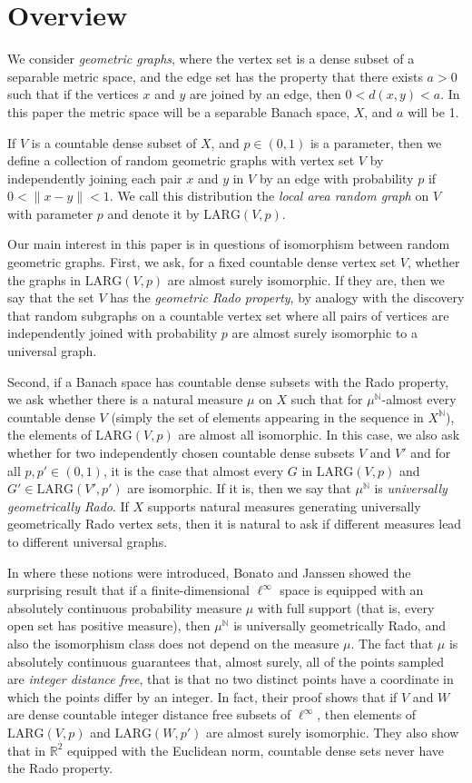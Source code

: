 \documentclass{daj}
\newcommand{\LARG}{\mathrm{LARG}}
\newcommand{\N}{\mathbb N}
\newcommand{\R}{\mathbb R}
\begin{document}
\section{Overview}
We consider \emph{geometric graphs}, where the vertex set is a dense subset of a
separable metric space, and the edge set has the property that there exists $a>0$ such that
if the vertices $x$ and $y$ are joined by an edge, then $0<d(x,y)<a$.
In this paper the metric space will be a separable Banach space, $X$,
and $a$ will be 1.

If $V$ is a countable dense subset of $X$, and $p\in(0,1)$ is a parameter,
then we define a collection of random geometric graphs with vertex set $V$ by independently joining
each pair $x$ and $y$ in $V$ by an edge with probability $p$ if $0<\|x-y\|<1$.
We call this distribution the \emph{local area random graph} on $V$ with parameter $p$
and denote it by $\LARG(V,p)$.

Our main interest in this paper is in questions of isomorphism between random geometric graphs. First, we ask, for a fixed countable dense vertex set $V$, whether the graphs in $\LARG(V,p)$ are almost surely isomorphic. If they are, then we say that the set $V$ has the \emph{geometric Rado property}, by analogy with the discovery that random subgraphs on
a countable vertex set where all pairs of vertices are independently joined with probability $p$
are almost surely isomorphic to a universal graph.

Second, if a Banach space has countable dense subsets with the Rado property, we ask whether
there is a natural measure $\mu$ on $X$ such that for $\mu^\N$-almost every
countable dense $V$ (simply the set of elements appearing in the sequence in $X^\N$),
the elements of $\LARG(V,p)$ are almost all isomorphic. In this case, we also
ask whether for two independently chosen countable dense subsets $V$ and $V'$ and for all $p,p'\in(0,1)$, it is the case that almost every $G$ in $\LARG(V,p)$ and $G'\in\LARG(V',p')$ are isomorphic.
If it is, then we say that $\mu^\N$ is \emph{universally geometrically Rado}.
If $X$ supports natural measures generating universally geometrically Rado vertex sets, then it is
natural to ask if different measures lead to different universal graphs.

In \cite{BJ1} where these notions were introduced, Bonato and Janssen showed the surprising result that
if a finite-dimensional $\ell^\infty$ space is equipped with an absolutely continuous probability
measure $\mu$ with full support (that is, every open set has positive measure), then $\mu^\N$ is
universally geometrically Rado, and also the isomorphism class does not depend on the measure $\mu$.
The fact that $\mu$ is absolutely continuous guarantees that, almost surely, all of the points
sampled are \emph{integer distance free}, that is that no two distinct points have a coordinate
in which the points differ by
an integer. In fact, their proof shows that if $V$ and $W$ are dense countable integer distance free subsets
of $\ell^\infty$, then elements of $\LARG(V,p)$ and $\LARG(W,p')$ are almost surely isomorphic. 
They also show that in $\R^2$ equipped with the Euclidean norm, countable dense sets never
have the Rado property. 
\end{document}
